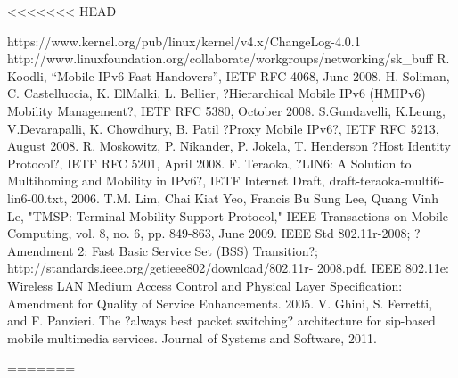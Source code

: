 <<<<<<< HEAD
\begin{thebibliography}{90}   
\rhead[\fancyplain{}{\bfseries \leftmark}]{\fancyplain{}{\bfseries
\thepage}}
 https://www.kernel.org/pub/linux/kernel/v4.x/ChangeLog-4.0.1
 http://www.linuxfoundation.org/collaborate/workgroups/networking/sk\_buff
 R. Koodli, ``Mobile IPv6 Fast Handovers'', IETF RFC 4068, June 2008.
  H. Soliman, C. Castelluccia, K. ElMalki, L. Bellier, ?Hierarchical Mobile IPv6 (HMIPv6) Mobility Management?, IETF RFC 5380, October 2008.
 S.Gundavelli, K.Leung, V.Devarapalli, K. Chowdhury, B. Patil ?Proxy Mobile IPv6?, IETF RFC 5213, August 2008.
 R. Moskowitz, P. Nikander, P. Jokela, T. Henderson ?Host Identity Protocol?, IETF RFC 5201, April 2008. 
 F. Teraoka, ?LIN6: A Solution to Multihoming and Mobility in IPv6?, IETF Internet Draft, draft-teraoka-multi6-lin6-00.txt, 2006.
	T.M. Lim, Chai Kiat Yeo, Francis Bu Sung Lee, Quang Vinh Le, "TMSP: Terminal Mobility Support Protocol," IEEE Transactions on Mobile Computing, vol. 8, no. 6, pp. 849-863, June 2009.
 IEEE Std 802.11r-2008; ?Amendment 2: Fast Basic Service Set (BSS) Transition?; http://standards.ieee.org/getieee802/download/802.11r- 2008.pdf.
 IEEE 802.11e: Wireless LAN Medium Access Control and Physical Layer Specification: Amendment for Quality of Service Enhancements. 2005.
 V. Ghini, S. Ferretti, and F. Panzieri. The ?always best packet switching? architecture for sip-based mobile multimedia services. Journal of Systems and Software, 2011.
\end{thebibliography}
=======
